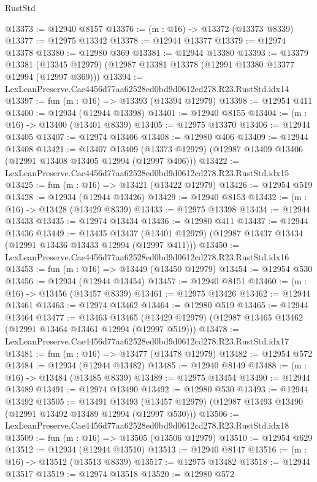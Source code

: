 \begin{lexlean}{RustStd}
\begin{coremodule}
@13373 := @12940 @8157
@13376 := (m : @16) -> @13372 (@13373 @8339)
@13377 := @12975 @13342
@13378 := @12944 @13377
@13379 := @12974 @13378
@13380 := @12980 @369
@13381 := @12944 @13380
@13393 := @13379
    @13381
    (@13345 @12979)
    (@12987 @13381 @13378 (@12991 @13380 @13377 @12994 (@12997 @369)))
@13394 := LexLeanPreserve.Cae4456d77aa62528ed0bd9d0612cd278.R23.RustStd.idx14
@13397 := fun (m : @16) => @13393 (@13394 @12979)
@13398 := @12954 @411
@13400 := @12934 (@12944 @13398)
@13401 := @12940 @8155
@13404 := (m : @16) -> @13400 (@13401 @8339)
@13405 := @12975 @13370
@13406 := @12944 @13405
@13407 := @12974 @13406
@13408 := @12980 @406
@13409 := @12944 @13408
@13421 := @13407
    @13409
    (@13373 @12979)
    (@12987 @13409 @13406 (@12991 @13408 @13405 @12994 (@12997 @406)))
@13422 := LexLeanPreserve.Cae4456d77aa62528ed0bd9d0612cd278.R23.RustStd.idx15
@13425 := fun (m : @16) => @13421 (@13422 @12979)
@13426 := @12954 @519
@13428 := @12934 (@12944 @13426)
@13429 := @12940 @8153
@13432 := (m : @16) -> @13428 (@13429 @8339)
@13433 := @12975 @13398
@13434 := @12944 @13433
@13435 := @12974 @13434
@13436 := @12980 @411
@13437 := @12944 @13436
@13449 := @13435
    @13437
    (@13401 @12979)
    (@12987 @13437 @13434 (@12991 @13436 @13433 @12994 (@12997 @411)))
@13450 := LexLeanPreserve.Cae4456d77aa62528ed0bd9d0612cd278.R23.RustStd.idx16
@13453 := fun (m : @16) => @13449 (@13450 @12979)
@13454 := @12954 @530
@13456 := @12934 (@12944 @13454)
@13457 := @12940 @8151
@13460 := (m : @16) -> @13456 (@13457 @8339)
@13461 := @12975 @13426
@13462 := @12944 @13461
@13463 := @12974 @13462
@13464 := @12980 @519
@13465 := @12944 @13464
@13477 := @13463
    @13465
    (@13429 @12979)
    (@12987 @13465 @13462 (@12991 @13464 @13461 @12994 (@12997 @519)))
@13478 := LexLeanPreserve.Cae4456d77aa62528ed0bd9d0612cd278.R23.RustStd.idx17
@13481 := fun (m : @16) => @13477 (@13478 @12979)
@13482 := @12954 @572
@13484 := @12934 (@12944 @13482)
@13485 := @12940 @8149
@13488 := (m : @16) -> @13484 (@13485 @8339)
@13489 := @12975 @13454
@13490 := @12944 @13489
@13491 := @12974 @13490
@13492 := @12980 @530
@13493 := @12944 @13492
@13505 := @13491
    @13493
    (@13457 @12979)
    (@12987 @13493 @13490 (@12991 @13492 @13489 @12994 (@12997 @530)))
@13506 := LexLeanPreserve.Cae4456d77aa62528ed0bd9d0612cd278.R23.RustStd.idx18
@13509 := fun (m : @16) => @13505 (@13506 @12979)
@13510 := @12954 @629
@13512 := @12934 (@12944 @13510)
@13513 := @12940 @8147
@13516 := (m : @16) -> @13512 (@13513 @8339)
@13517 := @12975 @13482
@13518 := @12944 @13517
@13519 := @12974 @13518
@13520 := @12980 @572

\end{coremodule}
\end{lexlean}
